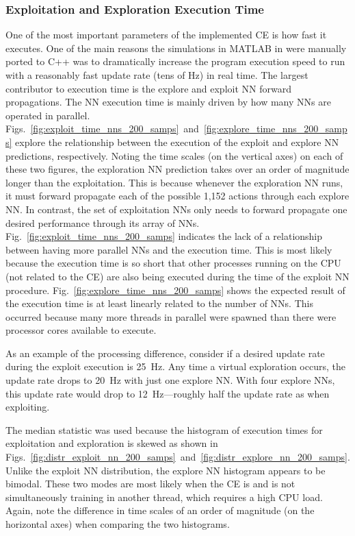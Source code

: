 \documentclass[journal]{IEEEtran}
\begin{document}
\subsubsection{Exploitation and Exploration Execution Time}
One of the most important parameters of the implemented CE is how fast it executes.  One of the main reasons the simulations in MATLAB in \cite{paulo-jrnl} were manually ported to C++ was to dramatically increase the program execution speed to run with a reasonably fast update rate (tens of Hz) in real time.  The largest contributor to execution time is the explore and exploit NN forward propagations.  The NN execution time is mainly driven by how many NNs are operated in parallel.  Figs.~\ref{fig:exploit_time_nns_200_samps}~and~\ref{fig:explore_time_nns_200_samps} explore the relationship between the execution of the exploit and explore NN predictions, respectively.  Noting the time scales (on the vertical axes) on each of these two figures, the exploration NN prediction takes over an order of magnitude longer than the exploitation.  This is because whenever the exploration NN runs, it must forward propagate each of the possible 1,152 actions through each explore NN.  In contrast, the set of exploitation NNs only needs to forward propagate one desired performance through its array of NNs.  Fig.~\ref{fig:exploit_time_nns_200_samps} indicates the lack of a relationship between having more parallel NNs and the execution time.  This is most likely because the execution time is so short that other processes running on the CPU (not related to the CE) are also being executed during the time of the exploit NN procedure.  Fig.~\ref{fig:explore_time_nns_200_samps} shows the expected result of the execution time is at least linearly related to the number of NNs.  This occurred because many more threads in parallel were spawned than there were processor cores available to execute.

As an example of the processing difference, consider if a desired update rate during the exploit execution is 25~Hz.  Any time a virtual exploration occurs, the update rate drops to 20~Hz with just one explore NN.  With four explore NNs, this update rate would drop to 12~Hz---roughly half the update rate as when exploiting.

The median statistic was used because the histogram of execution times for exploitation and exploration is skewed as shown in Figs.~\ref{fig:distr_exploit_nn_200_samps}~and~\ref{fig:distr_explore_nn_200_samps}.  Unlike the exploit NN distribution, the explore NN histogram appears to be bimodal.  These two modes are most likely when the CE is and is not simultaneously training in another thread, which requires a high CPU load.  Again, note the difference in time scales of an order of magnitude (on the horizontal axes) when comparing the two histograms.
\end{document}
